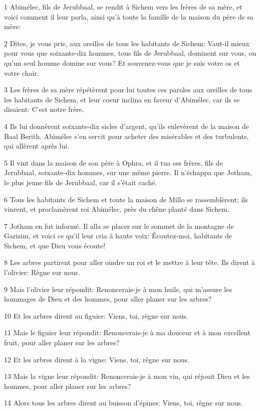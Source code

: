 \par 1 Abimélec, fils de Jerubbaal, se rendit à Sichem vers les frères de sa mère, et voici comment il leur parla, ainsi qu'à toute la famille de la maison du père de sa mère:
\par 2 Dites, je vous prie, aux oreilles de tous les habitants de Sichem: Vaut-il mieux pour vous que soixante-dix hommes, tous fils de Jerubbaal, dominent sur vous, ou qu'un seul homme domine sur vous? Et souvenez-vous que je suis votre os et votre chair.
\par 3 Les frères de sa mère répétèrent pour lui toutes ces paroles aux oreilles de tous les habitants de Sichem, et leur coeur inclina en faveur d'Abimélec, car ils se disaient: C'est notre frère.
\par 4 Ils lui donnèrent soixante-dix sicles d'argent, qu'ils enlevèrent de la maison de Baal Berith. Abimélec s'en servit pour acheter des misérables et des turbulents, qui allèrent après lui.
\par 5 Il vint dans la maison de son père à Ophra, et il tua ses frères, fils de Jerubbaal, soixante-dix hommes, sur une même pierre. Il n'échappa que Jotham, le plus jeune fils de Jerubbaal, car il s'était caché.
\par 6 Tous les habitants de Sichem et toute la maison de Millo se rassemblèrent; ils vinrent, et proclamèrent roi Abimélec, près du chêne planté dans Sichem.
\par 7 Jotham en fut informé. Il alla se placer sur le sommet de la montagne de Garizim, et voici ce qu'il leur cria à haute voix: Écoutez-moi, habitants de Sichem, et que Dieu vous écoute!
\par 8 Les arbres partirent pour aller oindre un roi et le mettre à leur tête. Ils dirent à l'olivier: Règne sur nous.
\par 9 Mais l'olivier leur répondit: Renoncerais-je à mon huile, qui m'assure les hommages de Dieu et des hommes, pour aller planer sur les arbres?
\par 10 Et les arbres dirent au figuier: Viens, toi, règne sur nous.
\par 11 Mais le figuier leur répondit: Renoncerais-je à ma douceur et à mon excellent fruit, pour aller planer sur les arbres?
\par 12 Et les arbres dirent à la vigne: Viens, toi, règne sur nous.
\par 13 Mais la vigne leur répondit: Renoncerais-je à mon vin, qui réjouit Dieu et les hommes, pour aller planer sur les arbres?
\par 14 Alors tous les arbres dirent au buisson d'épines: Viens, toi, règne sur nous.
